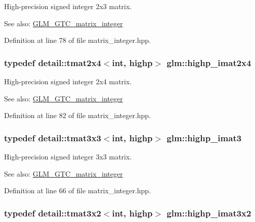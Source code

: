 High-precision signed integer 2x3 matrix. \begin{Desc}
\item[See also:]\hyperlink{group__gtc__matrix__integer}{GLM\_\-GTC\_\-matrix\_\-integer} \end{Desc}


Definition at line 78 of file matrix\_\-integer.hpp.\hypertarget{group__gtc__matrix__integer_g84aec2e744ecac589fe8d502266e8efc}{
\subsubsection[highp\_\-imat2x4]{\setlength{\rightskip}{0pt plus 5cm}typedef detail::tmat2x4$<$int, highp$>$ {\bf glm::highp\_\-imat2x4}}}
\label{group__gtc__matrix__integer_g84aec2e744ecac589fe8d502266e8efc}


High-precision signed integer 2x4 matrix. \begin{Desc}
\item[See also:]\hyperlink{group__gtc__matrix__integer}{GLM\_\-GTC\_\-matrix\_\-integer} \end{Desc}


Definition at line 82 of file matrix\_\-integer.hpp.\hypertarget{group__gtc__matrix__integer_gf12b3aa7e16a88b1fcf51be9a132048c}{
\subsubsection[highp\_\-imat3]{\setlength{\rightskip}{0pt plus 5cm}typedef detail::tmat3x3$<$int, highp$>$ {\bf glm::highp\_\-imat3}}}
\label{group__gtc__matrix__integer_gf12b3aa7e16a88b1fcf51be9a132048c}


High-precision signed integer 3x3 matrix. \begin{Desc}
\item[See also:]\hyperlink{group__gtc__matrix__integer}{GLM\_\-GTC\_\-matrix\_\-integer} \end{Desc}


Definition at line 66 of file matrix\_\-integer.hpp.\hypertarget{group__gtc__matrix__integer_g9780c1bc052a34c59dc95f4dd9e1a5c8}{
\subsubsection[highp\_\-imat3x2]{\setlength{\rightskip}{0pt plus 5cm}typedef detail::tmat3x2$<$int, highp$>$ {\bf glm::highp\_\-imat3x2}}}
\label{group__gtc__matrix__integer_g9780c1bc052a34c59dc95f4dd9e1a5c8}


